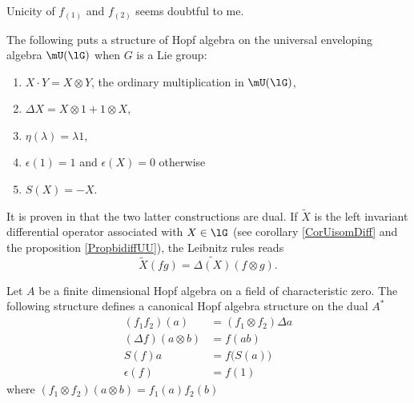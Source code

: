 \begin{probleme}
	Unicity of $f_{(1)}$ and $f_{(2)}$ seems doubtful to me.
\end{probleme}

The following puts a structure of Hopf algebra on the universal enveloping algebra $\mU(\lG)$ when $G$ is a Lie group:
\begin{enumerate}

	\item
		$X\cdot Y=X\otimes Y$, the ordinary multiplication in $\mU(\lG)$,
	\item
		$\Delta X=X\otimes 1+1\otimes X$,
	\item
		$\eta(\lambda)=\lambda 1$,
	\item	\label{ItemCounitUg}
		$\epsilon(1)=1$ and $\epsilon(X)=0$ otherwise
	\item
		$S(X)=-X$.

\end{enumerate}
It is proven in \cite{Tjin} that the two latter constructions are dual. If $\tilde X$ is the left invariant differential operator associated with $X\in\lG$ (see corollary \ref{CorUisomDiff} and the proposition \ref{PropbidiffUU}), the Leibnitz rules reads
\begin{equation}		\label{EqXfgDeltaUnif}
	\tilde X(fg)=\widetilde{\Delta(X)}(f\otimes g).
\end{equation}


\begin{proposition}     \label{PropHopfSurDual}
    Let \( A\) be a finite dimensional Hopf algebra on a field of characteristic zero. The following structure defines a canonical Hopf algebra structure on the dual \( A^*\)
    \begin{subequations}
        \begin{align}
            (f_1f_2)(a)&=(f_1\otimes f_2)\Delta a\\
            (\Delta f)(a\otimes b)&=f(ab)       \label{DefHopfSurAstar}\\
            S(f)a&=f\big( S(a) \big)\\
            \epsilon(f)&=f(1)
        \end{align}
    \end{subequations}
    where \( (f_1\otimes f_2)(a\otimes b)=f_1(a)f_2(b)\) 
\end{proposition}

